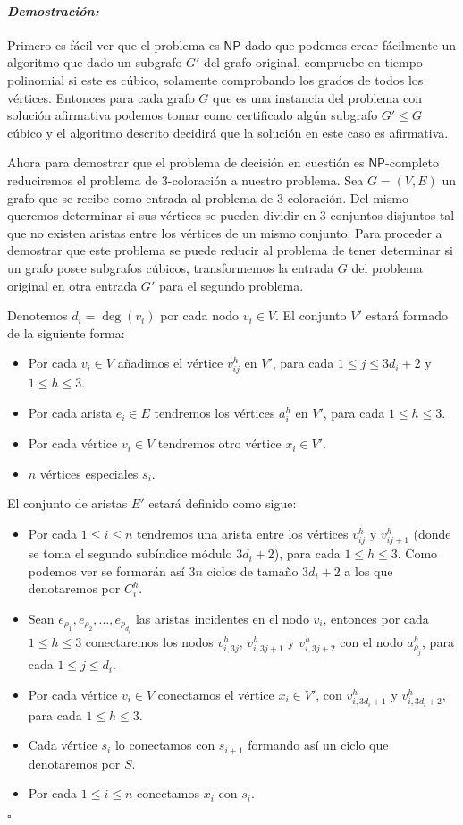 \documentclass[10pt]{amsart}
\theoremstyle{definition}
\numberwithin{equation}{section}
\newenvironment{myproof} {\paragraph{\emph{Demostraci\'on:}}}{\hfill$\square$}
\begin{document}
\begin{myproof}
	Primero es f\'acil ver que el problema es $\mathsf{NP}$ dado que podemos crear f\'acilmente un algoritmo que dado un subgrafo $G'$ del grafo original, compruebe en tiempo polinomial si este es c\'ubico, solamente comprobando los grados de todos los v\'ertices. Entonces para cada grafo $G$ que es una instancia del problema con soluci\'on afirmativa podemos tomar como certificado alg\'un subgrafo $G' \le G$ c\'ubico y el algoritmo descrito decidir\'a que la soluci\'on en este caso es afirmativa.
	
	Ahora para demostrar que el problema de decisi\'on en cuesti\'on es $\mathsf{NP}$-completo reduciremos el problema de $3$-coloraci\'on a nuestro problema. Sea $G = (V,E)$ un grafo que se recibe como entrada al problema de $3$-coloraci\'on. Del mismo queremos determinar si sus v\'ertices se pueden dividir en $3$ conjuntos disjuntos tal que no existen aristas entre los v\'ertices de un mismo conjunto. Para proceder a demostrar que este problema se puede reducir al problema de tener determinar si un grafo posee subgrafos c\'ubicos, transformemos la entrada $G$ del problema original en otra entrada $G'$ para el segundo problema. 
	
	Denotemos $d_i = \deg(v_i)$ por cada nodo $v_i \in V$. El conjunto $V'$ estar\'a formado de la siguiente forma:
	\begin{itemize}
		\item Por cada $v_i \in V$ a\~nadimos el v\'ertice $v_{ij}^h$ en $V'$, para cada $1 \le j \le 3d_i + 2$ y $1 \le h \le 3$.
		\item Por cada arista $e_i \in E$ tendremos los  v\'ertices $a_i^h$ en $V'$, para cada $1 \le h \le 3$.
		\item Por cada v\'ertice $v_i \in V$ tendremos otro v\'ertice $x_i \in V'$.
		\item $n$ v\'ertices especiales $s_i$.
	\end{itemize}

	El conjunto de aristas $E'$ estar\'a definido como sigue:
	\begin{itemize}
		\item Por cada $1 \le i \le n$ tendremos una arista entre los v\'ertices $v_{ij}^h$ y $v_{ij+1}^h$ (donde se toma el segundo sub\'indice m\'odulo $3d_i + 2$), para cada $1 \le h \le 3$. Como podemos ver se formar\'an as\'i $3n$ ciclos de tama\~no $3d_i + 2$ a los que denotaremos por $C_i^h$.
		\item Sean $e_{\rho_1}, e_{\rho_2}, \dots , e_{\rho_{d_i}}$ las aristas incidentes en el nodo $v_i$,  entonces por cada  $1 \le h \le 3$ conectaremos los nodos $v_{i,3j}^h$, $v_{i,3j + 1}^h$ y $v_{i,3j + 2}^h$ con el nodo  $a_{\rho_j}^h$, para cada $1 \le j \le d_i$.
		\item Por cada v\'ertice $v_i \in V$ conectamos el v\'ertice $x_i \in V'$, con $v_{i,3d_i + 1}^h$ y  $v_{i,3d_i + 2}^h$, para cada $1 \le h \le 3$.
		\item Cada v\'ertice $s_i$ lo conectamos con $s_{i+1}$ formando as\'i un ciclo que denotaremos por $S$.
		\item Por cada $1 \le i \le n$ conectamos $x_i$ con $s_i$. 
	\end{itemize}


\end{myproof}
\end{document}
